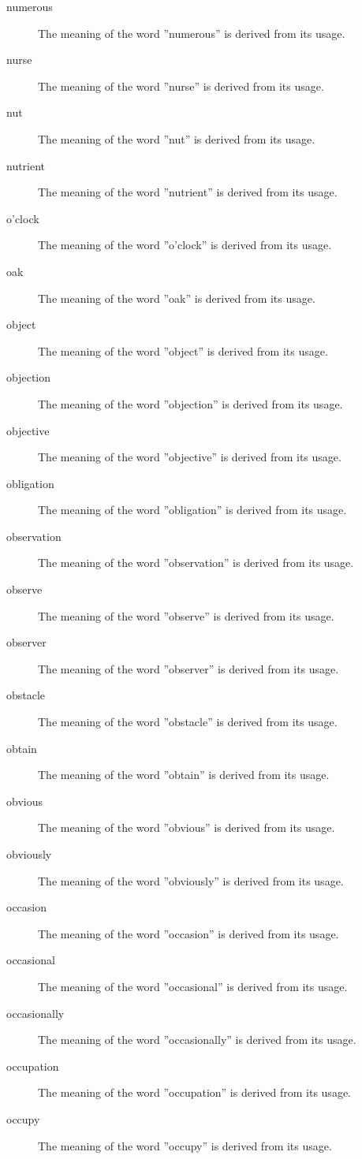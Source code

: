 \documentclass[12pt, letterpaper]{memoir}
\begin{document}
\begin{description}
\item[numerous] The meaning of the word ''numerous'' is derived from its usage.
\item[nurse] The meaning of the word ''nurse'' is derived from its usage.
\item[nut] The meaning of the word ''nut'' is derived from its usage.
\item[nutrient] The meaning of the word ''nutrient'' is derived from its usage.
\item[o'clock] The meaning of the word ''o'clock'' is derived from its usage.
\item[oak] The meaning of the word ''oak'' is derived from its usage.
\item[object] The meaning of the word ''object'' is derived from its usage.
\item[objection] The meaning of the word ''objection'' is derived from its usage.
\item[objective] The meaning of the word ''objective'' is derived from its usage.
\item[obligation] The meaning of the word ''obligation'' is derived from its usage.
\item[observation] The meaning of the word ''observation'' is derived from its usage.
\item[observe] The meaning of the word ''observe'' is derived from its usage.
\item[observer] The meaning of the word ''observer'' is derived from its usage.
\item[obstacle] The meaning of the word ''obstacle'' is derived from its usage.
\item[obtain] The meaning of the word ''obtain'' is derived from its usage.
\item[obvious] The meaning of the word ''obvious'' is derived from its usage.
\item[obviously] The meaning of the word ''obviously'' is derived from its usage.
\item[occasion] The meaning of the word ''occasion'' is derived from its usage.
\item[occasional] The meaning of the word ''occasional'' is derived from its usage.
\item[occasionally] The meaning of the word ''occasionally'' is derived from its usage.
\item[occupation] The meaning of the word ''occupation'' is derived from its usage.
\item[occupy] The meaning of the word ''occupy'' is derived from its usage.

\end{description}
\end{document}
